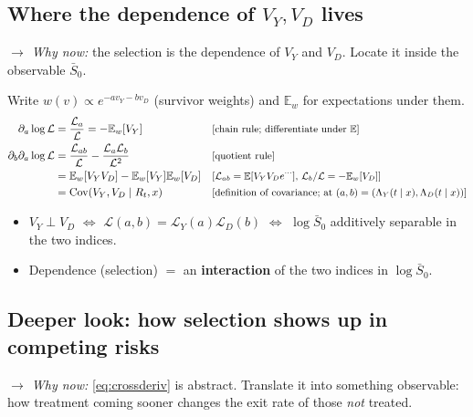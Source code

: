 \documentclass[11pt]{article}
\newcommand{\E}{\mathbb{E}}
\newcommand{\1}{\mathbf{1}}
\newcommand{\Lap}{\mathcal{L}}
\newcommand{\cov}{\operatorname{Cov}}
\newcommand{\why}[1]{\text{\small[#1]}}
\newcommand{\whynow}[1]{\par\noindent\textit{$\rightarrow$ Why now:} #1\par}
\begin{document}
\subsection{Where the dependence of $V_Y,V_D$ lives}
\whynow{the selection is the dependence of $V_Y$ and $V_D$. Locate it inside the observable $\bar S_0$.}
Write $w(v)\propto e^{-av_Y-bv_D}$ (survivor weights) and $\E_w$ for expectations under them.
\begin{align}
  \partial_a\log\Lap &= \frac{\Lap_a}{\Lap} = -\E_w[V_Y] && \why{chain rule; differentiate under $\E$} \nonumber\\
  \partial_b\partial_a\log\Lap &= \frac{\Lap_{ab}}{\Lap}-\frac{\Lap_a\Lap_b}{\Lap^2} && \why{quotient rule} \nonumber\\
  &= \E_w[V_YV_D]-\E_w[V_Y]\E_w[V_D] && \why{$\Lap_{ab}=\E[V_YV_De^{\cdots}]$, $\Lap_b/\Lap=-\E_w[V_D]$} \nonumber\\
  &= \cov(V_Y,V_D\mid R_t,x) && \why{definition of covariance; at $(a,b)=(\Lambda_Y(t\mid x),\Lambda_D(t\mid x))$} \label{eq:crossderiv}
\end{align}
\begin{itemize}
  \item $V_Y\perp V_D$ $\iff$ $\Lap(a,b)=\Lap_Y(a)\Lap_D(b)$ $\iff$ $\log \bar S_0$ additively separable in the two indices.
  \item Dependence (selection) $=$ an \textbf{interaction} of the two indices in $\log \bar S_0$.
\end{itemize}

\subsection{Deeper look: how selection shows up in competing risks}
\whynow{\eqref{eq:crossderiv} is abstract. Translate it into something observable: how treatment coming sooner changes the exit rate of those \emph{not} treated.}
\end{document}
